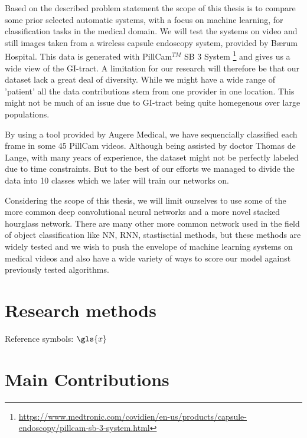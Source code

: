 \documentclass[thesis.tex]{subfiles}
\begin{document}
Based on the described problem statement the scope of this thesis is to compare some prior selected automatic systems, with a focus on machine learning, for classification tasks in the medical domain. We will test the systems on video and still images taken from a wireless capsule endoscopy system, provided by Bærum Hospital. This data is generated with PillCam$^{TM}$ SB 3 System \footnote{\url{https://www.medtronic.com/covidien/en-us/products/capsule-endoscopy/pillcam-sb-3-system.html}} and gives us a wide view of the GI-tract. A limitation for our research will therefore be that our dataset lack a great deal of diversity. While we might have a wide range of 'patient' all the data contributions stem from one provider in one location. This might not be much of an issue due to GI-tract being quite homegenous over large populations. 

By using a tool provided by Augere Medical, we have sequencially classified each frame in some 45 PillCam videos. Although being assisted by doctor Thomas de Lange, with many years of experience, the dataset might not be perfectly labeled due to time constraints. But to the best of our efforts we managed to divide the data into 10 classes which we later will train our networks on.

Considering the scope of this thesis, we will limit ourselves to use some of the more common deep convolutional neural networks and a more novel stacked hourglass network. There are many other more common network used in the field of object classification like NN, RNN, stastisctial methods, but these methods are widely tested and we wish to push the envelope of machine learning systems on medical videos and also have a wide variety of ways to score our model against previously tested algorithms.


\section{Research methods} \label{sec:research_methods}
Reference symbols: $\gls{x}$

\section{Main Contributions} \label{sec:main_contributions}
\end{document}
